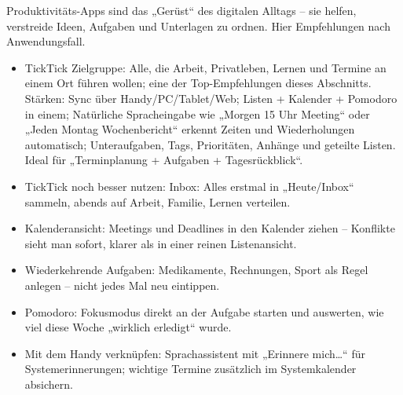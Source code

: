 


Produktivitäts-Apps sind das „Gerüst“ des digitalen Alltags – sie helfen, verstreide Ideen, Aufgaben und Unterlagen zu ordnen. Hier Empfehlungen nach Anwendungsfall.


\begin{itemize}
  \item TickTick Zielgruppe: Alle, die Arbeit, Privatleben, Lernen und Termine an einem Ort führen wollen; eine der Top-Empfehlungen dieses Abschnitts. Stärken: Sync über Handy/PC/Tablet/Web; Listen + Kalender + Pomodoro in einem; Natürliche Spracheingabe wie „Morgen 15 Uhr Meeting“ oder „Jeden Montag Wochenbericht“ erkennt Zeiten und Wiederholungen automatisch; Unteraufgaben, Tags, Prioritäten, Anhänge und geteilte Listen. Ideal für „Terminplanung + Aufgaben + Tagesrückblick“.
  \item TickTick noch besser nutzen: Inbox: Alles erstmal in „Heute/Inbox“ sammeln, abends auf Arbeit, Familie, Lernen verteilen.
  \item Kalenderansicht: Meetings und Deadlines in den Kalender ziehen – Konflikte sieht man sofort, klarer als in einer reinen Listenansicht.
  \item Wiederkehrende Aufgaben: Medikamente, Rechnungen, Sport als Regel anlegen – nicht jedes Mal neu eintippen.
  \item Pomodoro: Fokusmodus direkt an der Aufgabe starten und auswerten, wie viel diese Woche „wirklich erledigt“ wurde.
  \item Mit dem Handy verknüpfen: Sprachassistent mit „Erinnere mich…“ für Systemerinnerungen; wichtige Termine zusätzlich im Systemkalender absichern.
\end{itemize}

